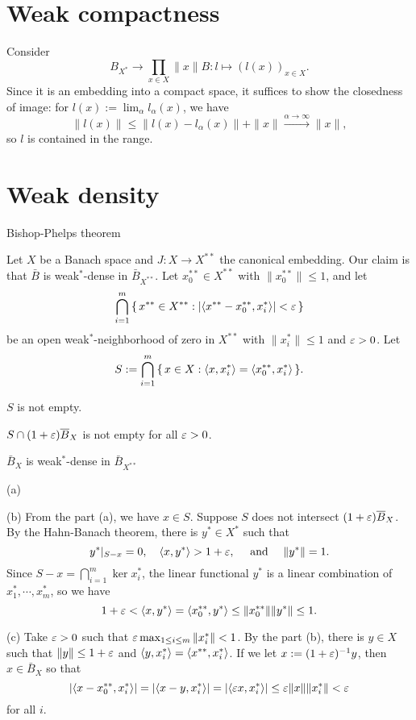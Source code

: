 \documentclass{../../large}
\begin{document}
\section{Weak compactness}
\begin{prb}
\end{prb}
\begin{pf}
Consider
\[B_{X^*}\to\prod_{x\in X}\|x\|B:l\mapsto(l(x))_{x\in X}.\]
Since it is an embedding into a compact space, it suffices to show the closedness of image: for $l(x):=\lim_\alpha l_\alpha(x)$, we have
\[\|l(x)\|\le\|l(x)-l_\alpha(x)\|+\|x\|\xrightarrow{\alpha\to\infty}\|x\|,\]
so $l$ is contained in the range.
\end{pf}
\begin{prb}
\end{prb}
\begin{prb}
\end{prb}

\section{Weak density}
Bishop-Phelps theorem

\begin{prb}
Let $X$ be a Banach space and $J:X\to X^{**}$ the canonical embedding.
Our claim is that $\bar B$ is weak$^*$-dense in $\bar B_{X^{**}}$.
Let $x_0^{**}\in X^{**}$ with $\|x_0^{**}\|\le1$, and let
\[\bigcap_{i=1}^m\,\{\,x^{**}\in X^{**}:|\langle x^{**}-x_0^{**},x_i^*\rangle|<\varepsilon\,\}\]
be an open weak$^*$-neighborhood of zero in $X^{**}$ with $\|x_i^*\|\le1$ and $\varepsilon>0$.
Let
\[S:=\bigcap_{i=1}^m\,\{\,x\in X:\langle x,x_i^*\rangle=\langle x_0^{**},x_i^*\rangle\,\}.\]
\begin{parts}
\item $S$ is not empty.
\item $S\cap(1+\varepsilon)\overline B_X$ is not empty for all $\varepsilon>0$.
\item $\bar B_X$ is weak$^*$-dense in $\bar B_{X^{**}}$
\end{parts}
\end{prb}
\begin{pf}
(a)

(b)
From the part (a), we have $x\in S$.
Suppose $S$ does not intersect $(1+\varepsilon)\overline B_X$.
By the Hahn-Banach theorem, there is $y^*\in X^*$ such that
\[y^*|_{S-x}=0,\quad\langle x,y^*\rangle>1+\varepsilon,\quad\text{ and }\quad\|y^*\|=1.\]
Since $S-x=\bigcap_{i=1}^m\ker x_i^*$, the linear functional $y^*$ is a linear combination of $x_1^*,\cdots,x_m^*$, so we have
\[1+\varepsilon<\langle x,y^*\rangle=\langle x_0^{**},y^*\rangle\le\|x_0^{**}\|\|y^*\|\le1.\]

(c)
Take $\varepsilon>0$ such that $\varepsilon\max_{1\le i\le m}\|x_i^*\|<1$.
By the part (b), there is $y\in X$ such that $\|y\|\le1+\varepsilon$ and $\langle y,x_i^*\rangle=\langle x^{**},x_i^*\rangle$.
If we let $x:=(1+\varepsilon)^{-1}y$, then $x\in\bar B_X$ so that
\[|\langle x-x_0^{**},x_i^*\rangle|=|\langle x-y,x_i^*\rangle|=|\langle\varepsilon x,x_i^*\rangle|\le\varepsilon\|x\|\|x_i^*\|<\varepsilon\]
for all $i$.
\end{pf}
\end{document}
